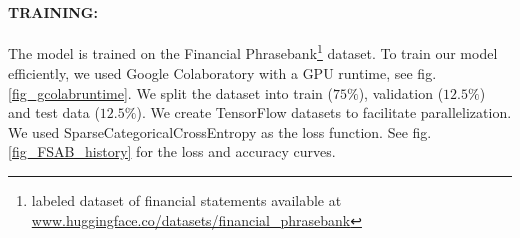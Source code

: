 \documentclass[11pt]{article}
\begin{document}
\paragraph{TRAINING:} {The model is trained on the Financial Phrasebank\footnote{labeled dataset of financial statements available at \href{www.huggingface.co/datasets/financial_phrasebank}{www.huggingface.co/datasets/financial\_phrasebank}} dataset. To train our model efficiently, we used Google Colaboratory with a GPU runtime, see fig. \ref{fig_gcolabruntime}. We split the dataset into train ($75\%$), validation ($12.5\%$) and test data ($12.5\%$). We create TensorFlow datasets to facilitate parallelization. We used SparseCategoricalCrossEntropy as the loss function. See fig. \ref{fig_FSAB_history} for the loss and accuracy curves.}
\end{document}
